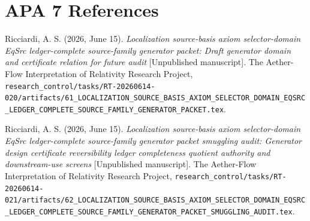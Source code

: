 \documentclass[11pt]{article}
\begin{document}
\section*{APA 7 References}

Ricciardi, A. S. (2026, June 15). \emph{Localization source-basis axiom
selector-domain EqSrc ledger-complete source-family generator packet:
Draft generator domain and certificate relation for future audit}
[Unpublished manuscript]. The Aether-Flow Interpretation of Relativity
Research Project,
\texttt{research\_control/tasks/RT-20260614-020/artifacts/61\_LOCALIZATION\_SOURCE\_BASIS\_AXIOM\_SELECTOR\_DOMAIN\_EQSRC\_LEDGER\_COMPLETE\_SOURCE\_FAMILY\_GENERATOR\_PACKET.tex}.

Ricciardi, A. S. (2026, June 15). \emph{Localization source-basis axiom
selector-domain EqSrc ledger-complete source-family generator packet
smuggling audit: Generator design certificate reversibility ledger
completeness quotient authority and downstream-use screens}
[Unpublished manuscript]. The Aether-Flow Interpretation of Relativity
Research Project,
\texttt{research\_control/tasks/RT-20260614-021/artifacts/62\_LOCALIZATION\_SOURCE\_BASIS\_AXIOM\_SELECTOR\_DOMAIN\_EQSRC\_LEDGER\_COMPLETE\_SOURCE\_FAMILY\_GENERATOR\_PACKET\_SMUGGLING\_AUDIT.tex}.
\end{document}
